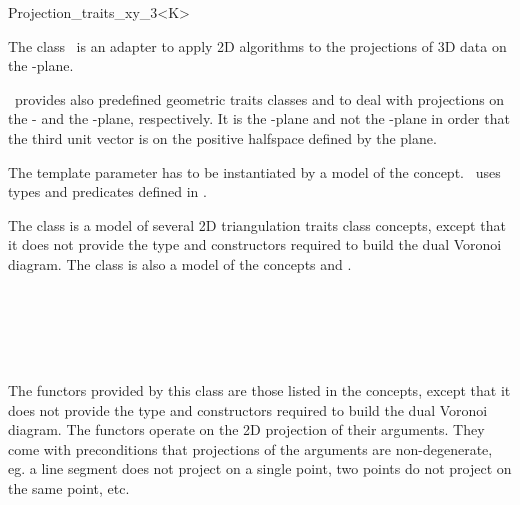 
\begin{ccRefClass}{Projection_traits_xy_3<K>}  %

\ccDefinition
  
The class \ccRefName\ is an adapter to apply 2D algorithms to the projections of 3D data on the -plane.


\cgal\ provides also predefined geometric traits classes
 and
 to
deal with projections on the
 - and  the -plane,
respectively.  It is the -plane and not the  -plane
in order that the third unit vector is on the positive halfspace
defined by the plane.

\ccParameters
The template parameter   has to
be instantiated by a model of the  concept.
\ccRefName\ uses types 
and predicates defined in .


\ccIsModel

The class is a model of several 2D triangulation traits class concepts,
except that it does not provide the type and constructors
required to build the dual Voronoi diagram. The class is also a model
of the concepts  and .

 \\
 \\
 \\
 \\

\ccTypes

\ccGlue
{}
\ccGlue
{}
\ccGlue
{}



The functors provided by this class are those listed in the concepts,
except that it does not provide the type and constructors
required to build the dual Voronoi diagram.
The functors operate on the 2D projection of their arguments. They come with preconditions that projections of the arguments are non-degenerate, eg. a line segment does not project on a single point, two points do not project on the same point, etc.


\end{ccRefClass}
